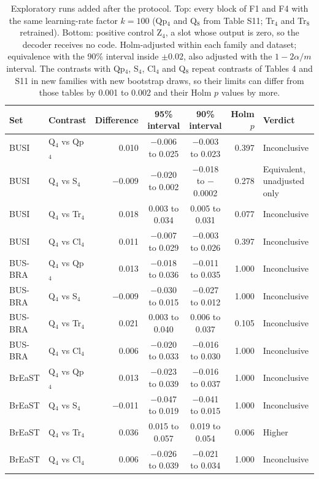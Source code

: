 \begin{table}[!ht]
\centering
\caption{Exploratory runs added after the protocol. Top: every block of F1 and F4 with the same learning-rate factor $k=100$ (Qp$_4$ and Q$_8$ from Table S11; Tr$_4$ and Tr$_8$ retrained). Bottom: positive control Z$_4$, a slot whose output is zero, so the decoder receives no code. Holm-adjusted within each family and dataset; equivalence with the 90\% interval inside $\pm0.02$, also adjusted with the $1-2\alpha/m$ interval. The contrasts with Qp$_4$, S$_4$, Cl$_4$ and Q$_8$ repeat contrasts of Tables 4 and S11 in new families with new bootstrap draws, so their limits can differ from those tables by 0.001 to 0.002 and their Holm $p$ values by more.}\label{stab:rev2}
\footnotesize
\begin{tabular}{@{}llrccrl@{}}
\toprule
Set & Contrast & Difference & 95\% interval & 90\% interval & Holm $p$ & Verdict \\
\midrule
BUSI & Q$_4$ vs Qp$_4$ & 0.010 & $-$0.006 to 0.025 & $-$0.003 to 0.023 & 0.397 & Inconclusive \\
BUSI & Q$_4$ vs S$_4$ & $-$0.009 & $-$0.020 to 0.002 & $-$0.018 to $-$0.0002 & 0.278 & Equivalent, unadjusted only \\
BUSI & Q$_4$ vs Tr$_4$ & 0.018 & 0.003 to 0.034 & 0.005 to 0.031 & 0.077 & Inconclusive \\
BUSI & Q$_4$ vs Cl$_4$ & 0.011 & $-$0.007 to 0.029 & $-$0.003 to 0.026 & 0.397 & Inconclusive \\
BUS-BRA & Q$_4$ vs Qp$_4$ & 0.013 & $-$0.018 to 0.036 & $-$0.011 to 0.035 & 1.000 & Inconclusive \\
BUS-BRA & Q$_4$ vs S$_4$ & $-$0.009 & $-$0.030 to 0.015 & $-$0.027 to 0.012 & 1.000 & Inconclusive \\
BUS-BRA & Q$_4$ vs Tr$_4$ & 0.021 & 0.003 to 0.040 & 0.006 to 0.037 & 0.105 & Inconclusive \\
BUS-BRA & Q$_4$ vs Cl$_4$ & 0.006 & $-$0.020 to 0.033 & $-$0.016 to 0.030 & 1.000 & Inconclusive \\
BrEaST & Q$_4$ vs Qp$_4$ & 0.013 & $-$0.023 to 0.039 & $-$0.016 to 0.037 & 1.000 & Inconclusive \\
BrEaST & Q$_4$ vs S$_4$ & $-$0.011 & $-$0.047 to 0.019 & $-$0.041 to 0.015 & 1.000 & Inconclusive \\
BrEaST & Q$_4$ vs Tr$_4$ & 0.036 & 0.015 to 0.057 & 0.019 to 0.054 & 0.006 & Higher \\
BrEaST & Q$_4$ vs Cl$_4$ & 0.006 & $-$0.026 to 0.039 & $-$0.021 to 0.034 & 1.000 & Inconclusive \\

\end{tabular}
\end{table}
